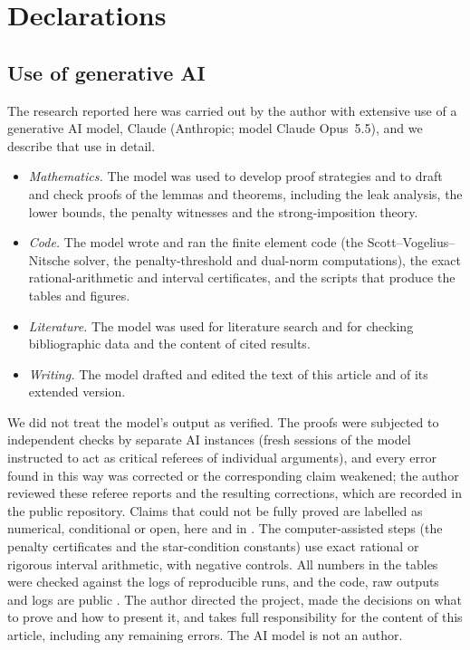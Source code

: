 \section*{Declarations}

\subsection*{Use of generative AI}
The research reported here was carried out by the author with extensive use of a generative AI model, Claude (Anthropic; model Claude Opus~5.5), and we describe that use in detail.
\begin{itemize}
\item \emph{Mathematics.} The model was used to develop proof strategies and to draft and check proofs of the lemmas and theorems, including the leak analysis, the lower bounds, the penalty witnesses and the strong-imposition theory.
\item \emph{Code.} The model wrote and ran the finite element code (the Scott--Vogelius--Nitsche solver, the penalty-threshold and dual-norm computations), the exact rational-arithmetic and interval certificates, and the scripts that produce the tables and figures.
\item \emph{Literature.} The model was used for literature search and for checking bibliographic data and the content of cited results.
\item \emph{Writing.} The model drafted and edited the text of this article and of its extended version.
\end{itemize}
We did not treat the model's output as verified. The proofs were subjected to independent checks by separate AI instances (fresh sessions of the model instructed to act as critical referees of individual arguments), and every error found in this way was corrected or the corresponding claim weakened; the author reviewed these referee reports and the resulting corrections, which are recorded in the public repository. Claims that could not be fully proved are labelled as numerical, conditional or open, here and in \cite{PadhiExt}. The computer-assisted steps (the penalty certificates and the star-condition constants) use exact rational or rigorous interval arithmetic, with negative controls. All numbers in the tables were checked against the logs of reproducible runs, and the code, raw outputs and logs are public \cite{ZeroGradRepo}. The author directed the project, made the decisions on what to prove and how to present it, and takes full responsibility for the content of this article, including any remaining errors. The AI model is not an author.

